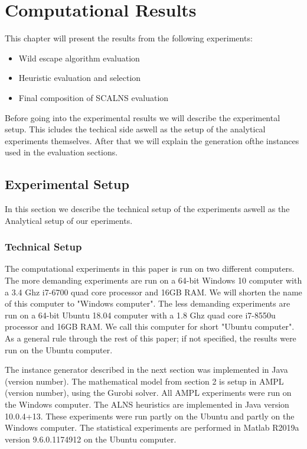 \documentclass[../main.tex]{subfiles}
\begin{document}
                                                
\chapter{Computational Results}
\label{ch:res}
This chapter will present the results from the following experiments:
\begin{itemize}
    \item Wild escape algorithm evaluation

    \item Heuristic evaluation and selection

    \item Final composition of SCALNS evaluation

\end{itemize}

Before going into the experimental results we will describe the experimental setup.
This icludes the techical side aswell as the setup of the analytical experiments themselves.
After that we will explain the generation ofthe instances used in the evaluation sections.

\section{Experimental Setup}
\label{sec:setup}
In this section we describe the technical setup of the experiments aswell as the Analytical setup of our eperiments.
\subsection{Technical Setup}
\label{sec:tech}
The computational experiments in this paper is run on two different computers. 
The more demanding experiments are run on a 64-bit Windows 10 computer with a 3.4 Ghz i7-6700 quad core processor and 16GB RAM. 
We will shorten the name of this computer to "Windows computer". 
The less demanding experiments are run on a 64-bit Ubuntu 18.04 computer with a 1.8 Ghz quad core i7-8550u processor and 16GB RAM. 
We call this computer for short "Ubuntu computer".
As a general rule through the rest of this paper; if not specified, the results were run on the Ubuntu computer.

The instance generator described in the next section was implemented in Java (version number).
The mathematical model from section 2 is setup in AMPL (version number), using the Gurobi solver. 
All AMPL experiments were run on the Windows computer.
The ALNS heuristics are implemented in Java version 10.0.4+13.
These experiments were run partly on the Ubuntu and partly on the Windows computer.
The statistical experiments are performed in Matlab R2019a version 9.6.0.1174912 on the Ubuntu computer.
\end{document}
